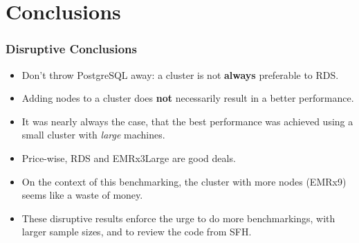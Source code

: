 \documentclass[hyperref={pdfpagelabels=true}]{beamer}
\begin{document}
\section{Conclusions} 
\begin{frame}
\frametitle{Disruptive Conclusions}
  \begin{itemize}    
    \item<2->Don't throw PostgreSQL away: a cluster is not \textbf{always} preferable to RDS.%
    \item<3->Adding nodes to a cluster does \textbf{not} necessarily result in a better performance.%
    \item<4->It was nearly always the case, that the best performance was achieved using a small cluster with \textit{large} machines.%
    \item<5->Price-wise, RDS and EMRx3Large are good deals.%
    \item<6->On the context of this benchmarking, the cluster with more nodes (EMRx9) seems like a waste of money.
    \item<7->These disruptive results enforce the urge to do more benchmarkings, with larger sample sizes, and to review the code from SFH.%
  \end{itemize} 
\end{frame}
\end{document}
